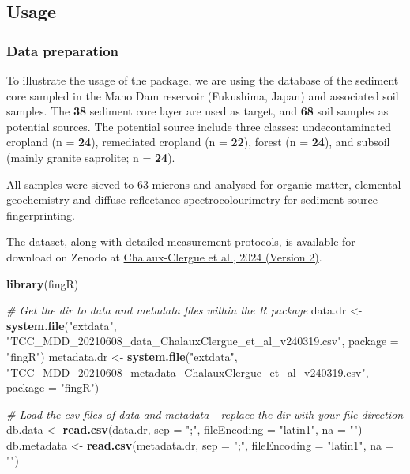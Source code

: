 \documentclass[
]{article}
\newenvironment{Shaded}{\begin{snugshade}}{\end{snugshade}}
\newcommand{\AttributeTok}[1]{\textcolor[rgb]{0.13,0.29,0.53}{#1}}
\newcommand{\CommentTok}[1]{\textcolor[rgb]{0.56,0.35,0.01}{\textit{#1}}}
\newcommand{\FunctionTok}[1]{\textcolor[rgb]{0.13,0.29,0.53}{\textbf{#1}}}
\newcommand{\NormalTok}[1]{#1}
\newcommand{\OtherTok}[1]{\textcolor[rgb]{0.56,0.35,0.01}{#1}}
\newcommand{\StringTok}[1]{\textcolor[rgb]{0.31,0.60,0.02}{#1}}
\begin{document}
\hypertarget{usage}{%
\subsection{Usage}\label{usage}}

\hypertarget{data-preparation}{%
\subsubsection{Data preparation}\label{data-preparation}}

To illustrate the usage of the package, we are using the database of the
sediment core sampled in the Mano Dam reservoir (Fukushima, Japan) and
associated soil samples. The \textbf{38} sediment core layer are used as
target, and \textbf{68} soil samples as potential sources. The potential
source include three classes: undecontaminated cropland (n =
\textbf{24}), remediated cropland (n = \textbf{22}), forest (n =
\textbf{24}), and subsoil (mainly granite saprolite; n = \textbf{24}).

All samples were sieved to 63 microns and analysed for organic matter,
elemental geochemistry and diffuse reflectance spectrocolourimetry for
sediment source fingerprinting.

The dataset, along with detailed measurement protocols, is available for
download on Zenodo at
\href{https://zenodo.org/doi/10.5281/zenodo.7081093}{Chalaux-Clergue et
al., 2024 (Version 2)}.

\begin{Shaded}
\begin{Highlighting}[]
\FunctionTok{library}\NormalTok{(fingR)}

\CommentTok{\# Get the dir to data and metadata files within the R package}
\NormalTok{data.dr }\OtherTok{\textless{}{-}} \FunctionTok{system.file}\NormalTok{(}\StringTok{"extdata"}\NormalTok{, }\StringTok{"TCC\_MDD\_20210608\_data\_ChalauxClergue\_et\_al\_v240319.csv"}\NormalTok{, }\AttributeTok{package =} \StringTok{"fingR"}\NormalTok{)}
\NormalTok{metadata.dr }\OtherTok{\textless{}{-}} \FunctionTok{system.file}\NormalTok{(}\StringTok{"extdata"}\NormalTok{, }\StringTok{"TCC\_MDD\_20210608\_metadata\_ChalauxClergue\_et\_al\_v240319.csv"}\NormalTok{, }\AttributeTok{package =} \StringTok{"fingR"}\NormalTok{)}

\CommentTok{\# Load the csv files of data and metadata {-} replace the dir with your file direction}
\NormalTok{db.data }\OtherTok{\textless{}{-}} \FunctionTok{read.csv}\NormalTok{(data.dr, }\AttributeTok{sep =} \StringTok{";"}\NormalTok{, }\AttributeTok{fileEncoding =} \StringTok{"latin1"}\NormalTok{, }\AttributeTok{na =} \StringTok{""}\NormalTok{)}
\NormalTok{db.metadata }\OtherTok{\textless{}{-}} \FunctionTok{read.csv}\NormalTok{(metadata.dr, }\AttributeTok{sep =} \StringTok{";"}\NormalTok{, }\AttributeTok{fileEncoding =} \StringTok{"latin1"}\NormalTok{, }\AttributeTok{na =} \StringTok{""}\NormalTok{)}
\end{Highlighting}
\end{Shaded}
\end{document}

